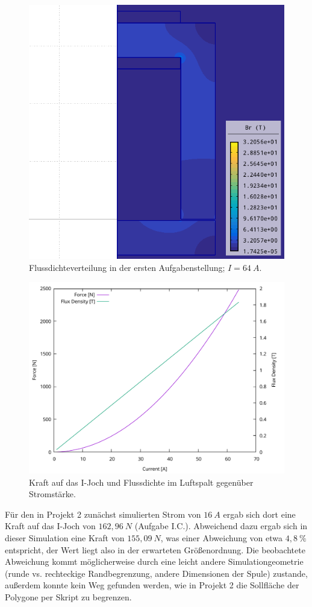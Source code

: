 \documentclass[conference,a4paper,twoside]{IEEEtran}
\begin{document}
\begin{figure}
\centerline{\includegraphics[width=0.7\columnwidth]{../assets/assignment_1_simulation.png}}
\caption{Flussdichteverteilung in der ersten Aufgabenstellung; $I = 64\ A$.}
\label{assignment_1_simulation}
\end{figure}

\begin{figure}
\centerline{\includegraphics[width=\columnwidth]{../assets/assignment_1_plot.pdf}}
\caption{Kraft auf das I-Joch und Flussdichte im Luftspalt gegenüber Stromstärke.}
\label{assignment_1_plot}
\end{figure}

Für den in Projekt 2 zunächst simulierten Strom von $16\ A$ ergab sich dort eine Kraft auf das I-Joch von $162,96\ N$ (Aufgabe I.C.). Abweichend dazu ergab sich in dieser Simulation eine Kraft von $155,09\ N$, was einer Abweichung von etwa $4,8\ \%$ entspricht, der Wert liegt also in der erwarteten Größenordnung. Die beobachtete Abweichung kommt möglicherweise durch eine leicht andere Simulationgeometrie (runde vs. rechteckige Randbegrenzung, andere Dimensionen der Spule) zustande, außerdem konnte kein Weg gefunden werden, wie in Projekt 2 die Sollfläche der Polygone per Skript zu begrenzen.
\end{document}
